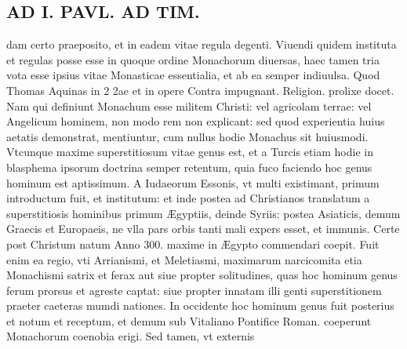 \documentclass{article}
\begin{document}
\begin{pages}
\section*{AD I. PAVL. AD TIM. }
\marginpar{[ p.214 ]}\pstart dam certo praeposito, et in eadem vitae regula degenti. Viuendi quidem instituta et regulas posse esse in quoque ordine Monachorum diuersas, haec tamen tria vota esse ipsius vitae Monasticae essentialia, et ab ea semper indiuulsa. Quod Thomas Aquinas in 2 2ae et in opere Contra impugnant. Religion. prolixe docet. Nam qui definiunt Monachum esse militem Christi: vel agricolam terrae: vel Angelicum hominem, non modo rem non explicant: sed quod experientia huius aetatis demonstrat, mentiuntur, cum nullus hodie Monachus sit huiusmodi. Vtcunque maxime superstitiosum vitae genus est, et a Turcis etiam hodie in blasphema ipsorum doctrina semper retentum, quia fuco faciendo hoc genus hominum est aptissimum. A Iudaeorum Essonis, vt multi existimant, primum introductum fuit, et institutum: et inde postea ad Christianos translatum a superstitiosis hominibus primum Ægyptiis, deinde Syriis: postea Asiaticis, demum Graecis et Europaeis, ne vlla pars orbis tanti mali expers esset, et immunis. Certe post Christum natum Anno 300. maxime in Ægypto commendari coepit. Fuit enim ea regio, vti Arrianismi, et Meletiasmi, maximarum narcicomita etia Monachismi satrix et ferax aut siue propter solitudines, quas hoc hominum genus ferum prorsus et agreste captat: siue propter innatam illi genti superstitionem praeter caeteras mumdi nationes. In occidente hoc hominum genus fuit posterius et notum et receptum, et demum sub Vitaliano Pontifice Roman. coeperunt Monachorum coenobia erigi. Sed tamen, vt externis  \pend

\end{pages}
\end{document}
